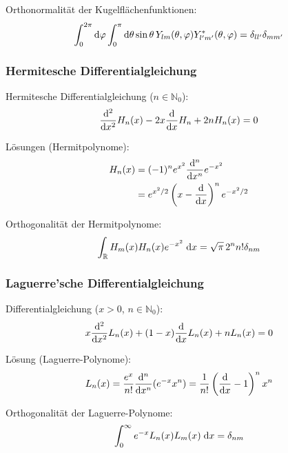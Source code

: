 			\noindent
			Orthonormalität der Kugelflächenfunktionen:
			\begin{equation}
				\int_0^{2\pi}\mathrm{d}\varphi \int_0^{\pi}\mathrm{d}\theta \sin\theta\, Y_{lm}(\theta,\varphi) Y^{*}_{l'm'}(\theta,\varphi) = 	\delta_{ll'}\delta_{mm'}
			\end{equation}

		\subsubsection{Hermitesche Differentialgleichung}
			\noindent
			Hermitesche Differentialgleichung ($n\in\mathbb{N}_0$):
			\begin{equation}
				\frac{\mathrm{d}^2}{\mathrm{d} x^2} H_n(x) -2x\frac{\mathrm{d} }{\mathrm{d} x} H_n+2 n H_n(x)=0
			\end{equation}

			\noindent
			Lösungen (Hermitpolynome):
			\begin{equation} \label{Eq:HermitePolynomials}
				\begin{aligned}
					H_n(x) &= (-1)^n e^{x^2} \frac{\mathrm{d}^n}{\mathrm{d} x^n}e^{-x^2} \\
					&= e^{x^2/2}\left(x-\frac{\mathrm{d} }{\mathrm{d} x}\right)^n e^{-x^2/2} \\
				\end{aligned}
			\end{equation}

			\noindent
			Orthogonalität der Hermitpolynome:
			\begin{equation}
				\int_{\mathbb{R}} H_m(x) H_n(x) e^{-x^2}\;\mathrm{d} x = \sqrt{\pi}\,2^n n!\delta_{nm}
			\end{equation}

		\subsubsection{Laguerre'sche Differentialgleichung}
			\noindent
			Differentialgleichung ($x>0$, $n\in\mathbb{N}_0$):
			\begin{equation}
				x\frac{\mathrm{d}^2}{\mathrm{d} x^2}L_n(x) +(1-x)\frac{\mathrm{d} }{\mathrm{d} x}L_n(x) + nL_n(x) = 0
			\end{equation}

			\noindent
			Lösung (Laguerre-Polynome):
			\begin{equation}
				L_n(x) = \frac{e^x}{n!}\frac{\mathrm{d}^n}{\mathrm{d} x^n}(e^{-x} x^n) = \frac{1}{n!} \left(\frac{\mathrm{d} }{\mathrm{d} x}-1\right)^n x^n
			\end{equation}

			\noindent
			Orthogonalität der Laguerre-Polynome:
			\begin{equation}
				\int_0^\infty e^{-x} L_n(x) L_m(x)\;\mathrm{d} x = \delta_{nm}
			\end{equation}

